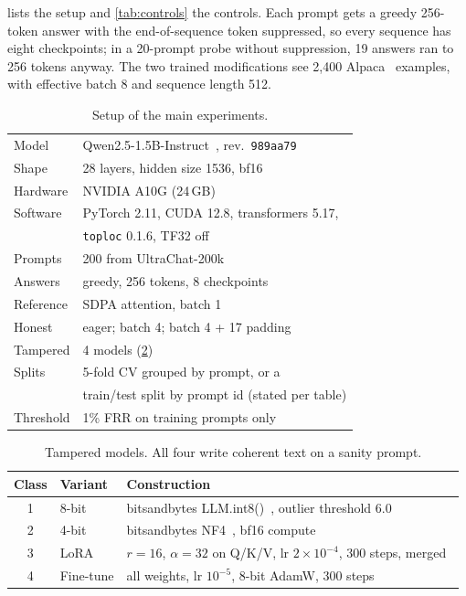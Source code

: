 \documentclass[11pt]{article}
\begin{document}
 lists the setup and \cref{tab:controls} the controls.
Each prompt gets a greedy 256-token answer with the end-of-sequence token suppressed, so every sequence has eight checkpoints; in a 20-prompt probe without suppression, 19 answers ran to 256 tokens anyway.
The two trained modifications see 2{,}400 Alpaca~\cite{taori2023alpaca} examples, with effective batch 8 and sequence length 512.

\begin{table}[!htb]
\centering
\small
\caption{Setup of the main experiments.}
\label{tab:setup}
\begin{tabular}{@{}ll@{}}
\toprule
Model & Qwen2.5-1.5B-Instruct~\cite{qwen2025qwen25}, rev.\ \texttt{989aa79} \\
Shape & 28 layers, hidden size 1536, bf16 \\
Hardware & NVIDIA A10G (24\,GB) \\
Software & PyTorch 2.11, CUDA 12.8, transformers 5.17, \\
 & \texttt{toploc} 0.1.6, TF32 off \\
Prompts & 200 from UltraChat-200k~\cite{ding2023ultrachat} \\
Answers & greedy, 256 tokens, 8 checkpoints \\
Reference & SDPA attention, batch 1 \\
Honest & eager; batch 4; batch 4 + 17 padding \\
Tampered & 4 models (\cref{tab:variants}) \\
Splits & 5-fold CV grouped by prompt, or a \\
 & train/test split by prompt id (stated per table) \\
Threshold & 1\% FRR on training prompts only \\
\bottomrule
\end{tabular}
\end{table}

\begin{table}[!htb]
\centering
\small
\caption{Tampered models. All four write coherent text on a sanity prompt.}
\label{tab:variants}
\begin{tabular}{@{}cll@{}}
\toprule
Class & Variant & Construction \\
\midrule
1 & 8-bit     & bitsandbytes LLM.int8()~\cite{dettmers2022llmint8}, outlier threshold 6.0 \\
2 & 4-bit     & bitsandbytes NF4~\cite{dettmers2023qlora}, bf16 compute \\
3 & LoRA      & $r{=}16$, $\alpha{=}32$ on Q/K/V, lr $2{\times}10^{-4}$, 300 steps, merged~\cite{hu2022lora} \\
4 & Fine-tune & all weights, lr $10^{-5}$, 8-bit AdamW, 300 steps \\
\bottomrule
\end{tabular}
\end{table}
\end{document}
